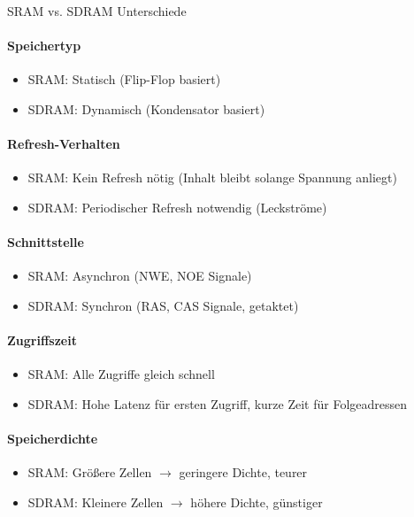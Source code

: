 \begin{KR}{SRAM vs. SDRAM Unterschiede}\\
    \paragraph{Speichertyp}
    \begin{itemize}
        \item SRAM: Statisch (Flip-Flop basiert)
        \item SDRAM: Dynamisch (Kondensator basiert)
    \end{itemize}
    
    \paragraph{Refresh-Verhalten}
    \begin{itemize}
        \item SRAM: Kein Refresh nötig (Inhalt bleibt solange Spannung anliegt)
        \item SDRAM: Periodischer Refresh notwendig (Leckströme)
    \end{itemize}
    
    \paragraph{Schnittstelle}
    \begin{itemize}
        \item SRAM: Asynchron (NWE, NOE Signale)
        \item SDRAM: Synchron (RAS, CAS Signale, getaktet)
    \end{itemize}
    
    \paragraph{Zugriffszeit}
    \begin{itemize}
        \item SRAM: Alle Zugriffe gleich schnell
        \item SDRAM: Hohe Latenz für ersten Zugriff, kurze Zeit für Folgeadressen
    \end{itemize}
    
    \paragraph{Speicherdichte}
    \begin{itemize}
        \item SRAM: Größere Zellen $\rightarrow$ geringere Dichte, teurer
        \item SDRAM: Kleinere Zellen $\rightarrow$ höhere Dichte, günstiger
    \end{itemize}
\end{KR}

